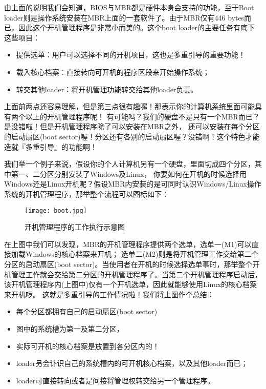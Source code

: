 由上面的说明我们会知道，BIOS与MBR都是硬件本身会支持的功能，至于Boot loader则是操作系统安装在MBR上面的一套软件了。由于MBR仅有446 bytes而已，因此这个开机管理程序是非常小而美的。这个boot loader的主要任务有底下这些项目：
\begin{itemize}
	\item 提供选单：用户可以选择不同的开机项目，这也是多重引导的重要功能！
	\item 载入核心档案：直接转向可开机的程序区段来开始操作系统；
	\item 转交其他loader：将开机管理功能转交给其他loader负责。
\end{itemize}

上面前两点还容易理解，但是第三点很有趣喔！那表示你的计算机系统里面可能具有两个以上的开机管理程序呢！ 有可能吗？我们的硬盘不是只有一个MBR而已？是没错啦！但是开机管理程序除了可以安装在MBR之外， 还可以安装在每个分区的启动扇区(boot sector)喔！分区还有各别的启动扇区喔？没错啊！这个特色才能造就『多重引导』的功能啊！

我们举一个例子来说，假设你的个人计算机另有一个硬盘，里面切成四个分区，其中第一、二分区分别安装了Windows及Linux， 你要如何在开机的时候选择用Windows还是Linux开机呢？假设MBR内安装的是可同时认识Windows/Linux操作系统的开机管理程序，那举整个流程可以图标如下：

\begin{figure}[H]
	\centering\texttt{[image: boot.jpg]}
	\caption{开机管理程序的工作执行示意图}
\end{figure}

在上图中我们可以发现，MBR的开机管理程序提供两个选单，选单一(M1)可以直接加载Windows的核心档案来开机； 选单二(M2)则是将开机管理工作交给第二个分区的启动扇区(boot sector)。当使用者在开机的时候选择选单事时，那举整个开机管理工作就会交给第二分区的开机管理程序了。当第二个开机管理程序启动后，该开机管理程序内(上图中)仅有一个开机选单，因此就能够使用Linux的核心档案来开机啰。 这就是多重引导的工作情况啦！我们将上图作个总结：

\begin{itemize}
	\item 每个分区都拥有自己的启动扇区(boot sector)
	\item 图中的系统槽为第一及第二分区，
	\item 实际可开机的核心档案是放置到各分区内的！
	\item loader叧会讣识自己的系统槽内的可开机核心档案，以及其他loader而已；
	\item loader可直接转向或者是间接将管理权转交给另一个管理程序。
\end{itemize}

